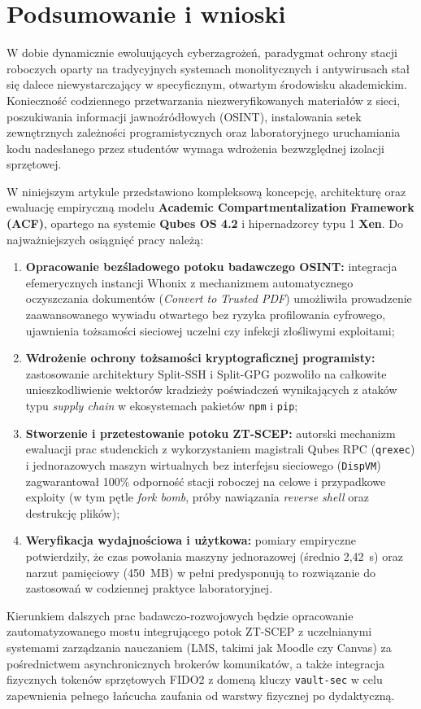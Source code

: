 \section{Podsumowanie i wnioski}
\label{sec:podsumowanie}

W dobie dynamicznie ewoluujących cyberzagrożeń, paradygmat ochrony stacji roboczych oparty na tradycyjnych systemach monolitycznych i antywirusach stał się dalece niewystarczający w specyficznym, otwartym środowisku akademickim. Konieczność codziennego przetwarzania niezweryfikowanych materiałów z sieci, poszukiwania informacji jawnoźródłowych (OSINT), instalowania setek zewnętrznych zależności programistycznych oraz laboratoryjnego uruchamiania kodu nadesłanego przez studentów wymaga wdrożenia bezwzględnej izolacji sprzętowej.

W niniejszym artykule przedstawiono kompleksową koncepcję, architekturę oraz ewaluację empiryczną modelu \textbf{Academic Compartmentalization Framework (ACF)}, opartego na systemie \textbf{Qubes OS 4.2} i hipernadzorcy typu 1 \textbf{Xen}. Do najważniejszych osiągnięć pracy należą:
\begin{enumerate}
    \item \textbf{Opracowanie bezśladowego potoku badawczego OSINT:} integracja efemerycznych instancji Whonix z mechanizmem automatycznego oczyszczania dokumentów (\textit{Convert to Trusted PDF}) umożliwiła prowadzenie zaawansowanego wywiadu otwartego bez ryzyka profilowania cyfrowego, ujawnienia tożsamości sieciowej uczelni czy infekcji złośliwymi exploitami;
    \item \textbf{Wdrożenie ochrony tożsamości kryptograficznej programisty:} zastosowanie architektury Split-SSH i Split-GPG pozwoliło na całkowite unieszkodliwienie wektorów kradzieży poświadczeń wynikających z ataków typu \textit{supply chain} w ekosystemach pakietów \texttt{npm} i \texttt{pip};
    \item \textbf{Stworzenie i przetestowanie potoku ZT-SCEP:} autorski mechanizm ewaluacji prac studenckich z wykorzystaniem magistrali Qubes RPC (\texttt{qrexec}) i jednorazowych maszyn wirtualnych bez interfejsu sieciowego (\texttt{DispVM}) zagwarantował 100\% odporność stacji roboczej na celowe i przypadkowe exploity (w tym pętle \textit{fork bomb}, próby nawiązania \textit{reverse shell} oraz destrukcję plików);
    \item \textbf{Weryfikacja wydajnościowa i użytkowa:} pomiary empiryczne potwierdziły, że czas powołania maszyny jednorazowej (średnio 2,42~s) oraz narzut pamięciowy (450~MB) w pełni predysponują to rozwiązanie do zastosowań w codziennej praktyce laboratoryjnej.
\end{enumerate}

Kierunkiem dalszych prac badawczo-rozwojowych będzie opracowanie zautomatyzowanego mostu integrującego potok ZT-SCEP z uczelnianymi systemami zarządzania nauczaniem (LMS, takimi jak Moodle czy Canvas) za pośrednictwem asynchronicznych brokerów komunikatów, a także integracja fizycznych tokenów sprzętowych FIDO2 z domeną kluczy \texttt{vault-sec} w celu zapewnienia pełnego łańcucha zaufania od warstwy fizycznej po dydaktyczną.
